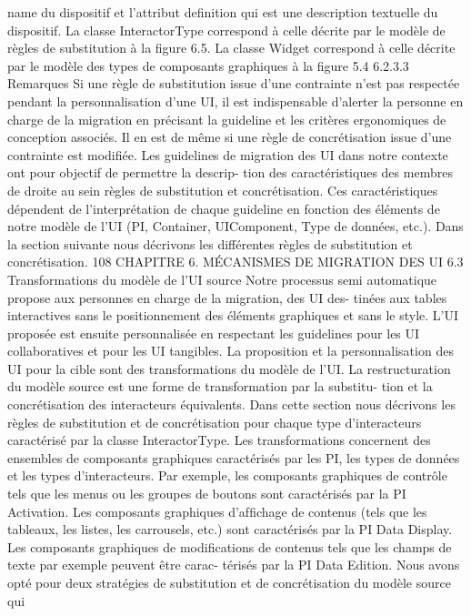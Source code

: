 \documentclass{article}
\begin{document}
name du dispositif et l’attribut deﬁnition qui est une description textuelle du dispositif.
La classe InteractorType
correspond à celle décrite par le modèle de règles de substitution à la
ﬁgure 6.5.
La classe Widget
correspond à celle décrite par le modèle des types de composants graphiques à la
ﬁgure 5.4
6.2.3.3
Remarques
Si une règle de substitution issue d’une contrainte n’est pas respectée pendant la personnalisation
d’une UI, il est indispensable d’alerter la personne en charge de la migration en précisant la guideline
et les critères ergonomiques de conception associés.
Il en est de même si une règle de concrétisation issue d’une contrainte est modiﬁée.
Les guidelines de migration des UI dans notre contexte ont pour objectif de permettre la descrip-
tion des caractéristiques des membres de droite au sein règles de substitution et concrétisation. Ces
caractéristiques dépendent de l’interprétation de chaque guideline en fonction des éléments de notre
modèle de l’UI (PI, Container, UIComponent, Type de données, etc.).
Dans la section suivante nous décrivons les différentes règles de substitution et concrétisation.
108
CHAPITRE 6. MÉCANISMES DE MIGRATION DES UI
6.3
Transformations du modèle de l’UI source
Notre processus semi automatique propose aux personnes en charge de la migration, des UI des-
tinées aux tables interactives sans le positionnement des éléments graphiques et sans le style. L’UI
proposée est ensuite personnalisée en respectant les guidelines pour les UI collaboratives et pour les
UI tangibles. La proposition et la personnalisation des UI pour la cible sont des transformations du
modèle de l’UI. La restructuration du modèle source est une forme de transformation par la substitu-
tion et la concrétisation des interacteurs équivalents.
Dans cette section nous décrivons les règles de substitution et de concrétisation pour chaque type
d’interacteurs caractérisé par la classe InteractorType. Les transformations concernent des ensembles
de composants graphiques caractérisés par les PI, les types de données et les types d’interacteurs.
Par exemple, les composants graphiques de contrôle tels que les menus ou les groupes de boutons
sont caractérisés par la PI Activation. Les composants graphiques d’afﬁchage de contenus (tels que
les tableaux, les listes, les carrousels, etc.) sont caractérisés par la PI Data Display. Les composants
graphiques de modiﬁcations de contenus tels que les champs de texte par exemple peuvent être carac-
térisés par la PI Data Edition.
Nous avons opté pour deux stratégies de substitution et de concrétisation du modèle source qui
\end{document}
